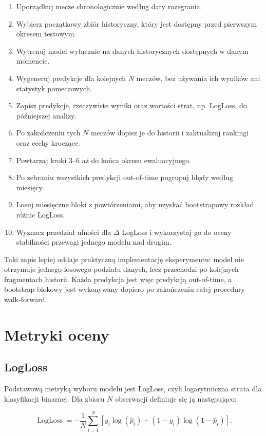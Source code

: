 \begin{enumerate}
    \item Uporządkuj mecze chronologicznie według daty rozegrania.
    \item Wybierz początkowy zbiór historyczny, który jest dostępny przed pierwszym okresem testowym.
    \item Wytrenuj model wyłącznie na danych historycznych dostępnych w danym momencie.
    \item Wygeneruj predykcje dla kolejnych $N$ meczów, bez używania ich wyników ani statystyk pomeczowych.
    \item Zapisz predykcje, rzeczywiste wyniki oraz wartości strat, np. LogLoss, do późniejszej analizy.
    \item Po zakończeniu tych $N$ meczów dopisz je do historii i zaktualizuj rankingi oraz cechy kroczące.
    \item Powtarzaj kroki 3--6 aż do końca okresu ewaluacyjnego.
    \item Po zebraniu wszystkich predykcji out-of-time pogrupuj błędy według miesięcy.
    \item Losuj miesięczne bloki z powtórzeniami, aby uzyskać bootstrapowy rozkład różnic LogLoss.
    \item Wyznacz przedział ufności dla $\Delta$ LogLoss i wykorzystaj go do oceny stabilności przewagi jednego modelu nad drugim.
\end{enumerate}

Taki zapis lepiej oddaje praktyczną implementację eksperymentu: model nie otrzymuje jednego losowego
podziału danych, lecz przechodzi po kolejnych fragmentach historii. Każda predykcja jest więc
predykcją out-of-time, a bootstrap blokowy jest wykonywany dopiero po zakończeniu całej procedury
walk-forward.

\section{Metryki oceny}

\subsection{LogLoss}

Podstawową metryką wyboru modelu jest LogLoss, czyli logarytmiczna strata dla klasyfikacji binarnej.
Dla zbioru \(N\) obserwacji definiuje się ją następująco:

\begin{equation}
    \operatorname{LogLoss} = -\frac{1}{N}\sum_{i=1}^{N}\left[y_i \log(\hat{p}_i) + (1-y_i)\log(1-\hat{p}_i)\right].
\end{equation}


